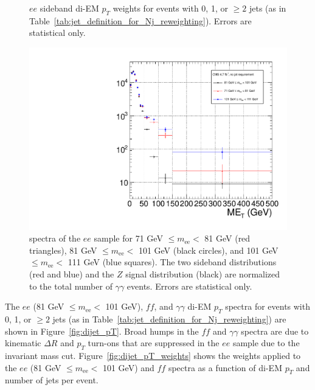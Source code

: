 \documentclass[dissertation.tex]{subfiles}
\begin{document}
\begin{figure}
	\caption{$ee$ sideband di-EM $p_{T}$ weights for events with 0, 1, or $\geq 2$ jets (as in Table~\ref{tab:jet_definition_for_Nj_reweighting}).  Errors are statistical only.}
	\label{fig:ee_sideband_dijet_pT_weights}
\end{figure}

\begin{figure}
	\centering
	\includegraphics[scale=0.3]{all_ee_MET_spectra}
	\caption{\MET spectra of the $ee$ sample for 71 GeV $\leq m_{\mathrm{ee}} <$ 81 GeV (red triangles), 81 GeV $\leq m_{\mathrm{ee}} <$ 101 GeV (black circles), and 101 GeV $\leq m_{\mathrm{ee}} <$ 111 GeV (blue squares).  The two sideband distributions (red and blue) and the  $Z$ signal distribution (black) are normalized to the total number of $\gamma\gamma$ events.  Errors are statistical only.}
	\label{fig:all_ee_MET_spectra}
\end{figure}

The $ee$ (81 GeV $\leq m_{\mathrm{ee}} <$ 101 GeV), $\mathit{ff}$, and $\gamma\gamma$ di-EM $p_{T}$ spectra for events with 0, 1, or $\geq 2$ jets (as in Table~\ref{tab:jet_definition_for_Nj_reweighting}) are shown in Figure~\ref{fig:dijet_pT}.  Broad humps in the $\mathit{ff}$ and $\gamma\gamma$ spectra are due to kinematic $\Delta R$ and $p_{T}$ turn-ons that are suppressed in the $ee$ sample due to the invariant mass cut.  Figure~\ref{fig:dijet_pT_weights} shows the weights applied to the $ee$ (81 GeV $\leq m_{\mathrm{ee}} <$ 101 GeV) and $\mathit{ff}$ \MET spectra as a function of di-EM $p_{T}$ and number of jets per event.
\end{document}
